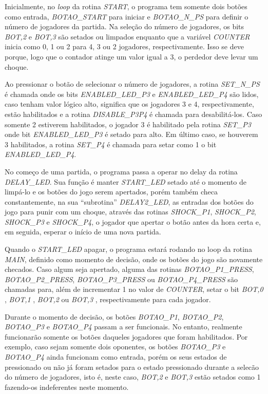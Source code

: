\documentclass[article]{IEEEtran}
\begin{document}
Inicialmente, no \textit{loop} da rotina \textit{START}, o programa tem somente dois botões como entrada, \textit{BOTAO\_START} para iniciar e \textit{BOTAO\_N\_PS} para definir o número de jogadores da partida. Na seleção do número de jogadores, os bits \textit{BOT,2} e \textit{BOT,3} são setados ou limpados enquanto que a variável \textit{COUNTER} inicia como 0, 1 ou 2 para 4, 3 ou 2 jogadores, respectivamente. Isso se deve porque, logo que o contador atinge um valor igual a 3, o perdedor deve levar um choque.

Ao pressionar o botão de selecionar o número de jogadores, a rotina \textit{SET\_N\_PS} é chamada onde os bits \textit{ENABLED\_LED\_P3} e \textit{ENABLED\_LED\_P4} são lidos, caso tenham valor lógico alto, significa que os jogadores 3 e 4, respectivamente, estão habilitados e a rotina \textit{DISABLE\_P3P4} é chamada para desabilitá-los. Caso somente 2 estiverem habilitados, o jogador 3 é habilitado pela rotina \textit{SET\_P3} onde bit \textit{ENABLED\_LED\_P3} é setado para alto. Em último caso, se houverem 3 habilitados, a rotina \textit{SET\_P4} é chamada para setar como 1 o bit \textit{ENABLED\_LED\_P4}.

No começo de uma partida, o programa passa a operar no delay da rotina \textit{DELAY\_LED}. Sua função é manter \textit{START\_LED} setado até o momento de limpá-lo e os botões do jogo serem apertados, porém também checa constantemente, na sua ``subrotina'' \textit{DELAY2\_LED}, as entradas dos botões do jogo para punir com um choque, através das rotinas \textit{SHOCK\_P1}, \textit{SHOCK\_P2}, \textit{SHOCK\_P3} e \textit{SHOCK\_P4}, o jogador que apertar o botão antes da hora certa e, em seguida, esperar o início de uma nova partida.

Quando o \textit{START\_LED} apagar, o programa estará rodando no loop da rotina \textit{MAIN}, definido como momento de decisão, onde os botões do jogo são novamente checados. Caso algum seja apertado, alguma das rotinas \textit{BOTAO\_P1\_PRESS}, \textit{BOTAO\_P2\_PRESS}, \textit{BOTAO\_P3\_PRESS} ou \textit{BOTAO\_P4\_PRESS} são chamadas para, além de incrementar 1 no valor de \textit{COUNTER}, setar o bit \textit{BOT,0} , \textit{BOT,1} , \textit{BOT,2} ou \textit{BOT,3} , respectivamente para cada jogador.

Durante o momento de decisão, os botões \textit{BOTAO\_P1}, \textit{BOTAO\_P2}, \textit{BOTAO\_P3} e \textit{BOTAO\_P4} passam a ser funcionais. No entanto, realmente funcionarão somente os botões daqueles jogadores que foram habilitados. Por exemplo, caso sejam somente dois oponentes, os botões \textit{BOTAO\_P3} e \textit{BOTAO\_P4} ainda funcionam como entrada, porém os seus estados de pressionado ou não já foram setados para o estado pressionado durante a selecão do número de jogadores, isto é, neste caso, \textit{BOT,2} e \textit{BOT,3} estão setados como 1 fazendo-os indeferentes neste momento.
\end{document}
